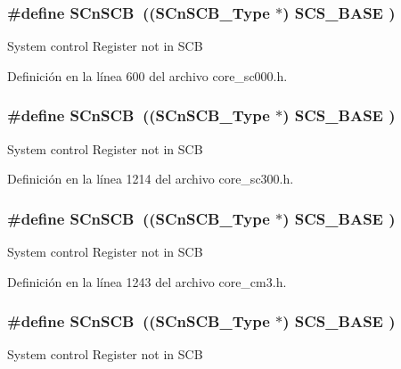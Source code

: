 \subsubsection[{\texorpdfstring{S\+Cn\+S\+CB}{SCnSCB}}]{\setlength{\rightskip}{0pt plus 5cm}\#define S\+Cn\+S\+CB~(({\bf S\+Cn\+S\+C\+B\+\_\+\+Type}    $\ast$)     {\bf S\+C\+S\+\_\+\+B\+A\+SE}      )}\hypertarget{group___c_m_s_i_s__core__base_ga9fe0cd2eef83a8adad94490d9ecca63f}{}\label{group___c_m_s_i_s__core__base_ga9fe0cd2eef83a8adad94490d9ecca63f}
System control Register not in S\+CB 

Definición en la línea 600 del archivo core\+\_\+sc000.\+h.

\subsubsection[{\texorpdfstring{S\+Cn\+S\+CB}{SCnSCB}}]{\setlength{\rightskip}{0pt plus 5cm}\#define S\+Cn\+S\+CB~(({\bf S\+Cn\+S\+C\+B\+\_\+\+Type}    $\ast$)     {\bf S\+C\+S\+\_\+\+B\+A\+SE}      )}\hypertarget{group___c_m_s_i_s__core__base_ga9fe0cd2eef83a8adad94490d9ecca63f}{}\label{group___c_m_s_i_s__core__base_ga9fe0cd2eef83a8adad94490d9ecca63f}
System control Register not in S\+CB 

Definición en la línea 1214 del archivo core\+\_\+sc300.\+h.

\subsubsection[{\texorpdfstring{S\+Cn\+S\+CB}{SCnSCB}}]{\setlength{\rightskip}{0pt plus 5cm}\#define S\+Cn\+S\+CB~(({\bf S\+Cn\+S\+C\+B\+\_\+\+Type}    $\ast$)     {\bf S\+C\+S\+\_\+\+B\+A\+SE}      )}\hypertarget{group___c_m_s_i_s__core__base_ga9fe0cd2eef83a8adad94490d9ecca63f}{}\label{group___c_m_s_i_s__core__base_ga9fe0cd2eef83a8adad94490d9ecca63f}
System control Register not in S\+CB 

Definición en la línea 1243 del archivo core\+\_\+cm3.\+h.

\subsubsection[{\texorpdfstring{S\+Cn\+S\+CB}{SCnSCB}}]{\setlength{\rightskip}{0pt plus 5cm}\#define S\+Cn\+S\+CB~(({\bf S\+Cn\+S\+C\+B\+\_\+\+Type}    $\ast$)     {\bf S\+C\+S\+\_\+\+B\+A\+SE}      )}\hypertarget{group___c_m_s_i_s__core__base_ga9fe0cd2eef83a8adad94490d9ecca63f}{}\label{group___c_m_s_i_s__core__base_ga9fe0cd2eef83a8adad94490d9ecca63f}
System control Register not in S\+CB 

